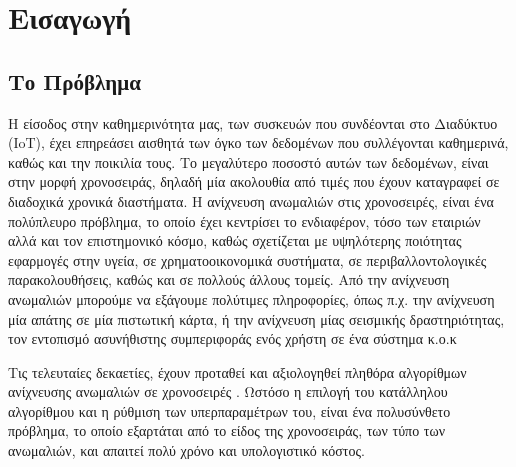 
\chapter{Εισαγωγή} %

\label{Chapter1} %


\newcommand{\keyword}[1]{\textbf{#1}}
\newcommand{\tabhead}[1]{\textbf{#1}}
\newcommand{\code}[1]{\texttt{#1}}
\newcommand{\file}[1]{\texttt{\bfseries#1}}
\newcommand{\option}[1]{\texttt{\itshape#1}}


\section{Το Πρόβλημα}

Η είσοδος στην καθημερινότητα μας, των συσκευών που συνδέονται στο Διαδύκτυο (IoT), έχει επηρεάσει αισθητά των όγκο των δεδομένων που συλλέγονται καθημερινά, καθώς και την ποικιλία τους. Το μεγαλύτερο ποσοστό αυτών των δεδομένων, είναι στην μορφή χρονοσειράς, δηλαδή μία ακολουθία από τιμές που έχουν καταγραφεί σε διαδοχικά χρονικά διαστήματα. Η ανίχνευση ανωμαλιών στις χρονοσειρές, είναι ένα πολύπλευρο πρόβλημα, το οποίο έχει κεντρίσει το ενδιαφέρον, τόσο των εταιριών αλλά και τον επιστημονικό κόσμο, καθώς σχετίζεται με υψηλότερης ποιότητας εφαρμογές στην υγεία, σε χρηματοοικονομικά συστήματα, σε περιβαλλοντολογικές παρακολουθήσεις, καθώς και σε πολλούς άλλους τομείς. Από την ανίχνευση ανωμαλιών μπορούμε να εξάγουμε πολύτιμες πληροφορίες, όπως π.χ. την ανίχνευση μία απάτης σε μία πιστωτική κάρτα, ή την ανίχνευση μίας σεισμικής δραστηριότητας, τον εντοπισμό ασυνήθιστης συμπεριφοράς ενός χρήστη σε ένα σύστημα κ.ο.κ

Τις τελευταίες δεκαετίες, έχουν προταθεί και αξιολογηθεί πληθόρα αλγορίθμων ανίχνευσης ανωμαλιών σε χρονοσειρές \cite{paparrizos2022tsb,gao2020ensemble,liu2008isolation,breunig2000lof,boniol2021sand,boniol2020automated,benecki2021detecting,boniol2021unsupervised,boniol2022theseus,boniol2021sand,yeh2016matrix,boniol2022series2graph,linardi2020matrix,yeh2018time,boniol2021sand_action}. Ωστόσο η επιλογή του κατάλληλου αλγορίθμου και η ρύθμιση των υπερπαραμέτρων του, είναι ένα πολυσύνθετο πρόβλημα, το οποίο εξαρτάται από το είδος της χρονοσειράς, των τύπο των ανωμαλιών, και απαιτεί πολύ χρόνο και υπολογιστικό κόστος.

